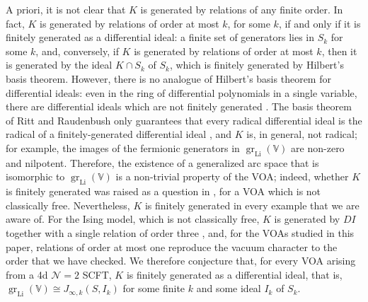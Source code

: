 \documentclass[12pt]{article}
\numberwithin{equation}{section}
\numberwithin{figure}{section}
\theoremstyle{plain}
\theoremstyle{definition}
\begin{document}
A priori, it is not clear that $K$ is generated by relations of any finite order. In fact, $K$ is generated by relations of order at most $k$, for some $k$, if and only if it is finitely generated as a differential ideal: a finite set of generators lies in $S_k$ for some $k$, and, conversely, if $K$ is generated by relations of order at most $k$, then it is generated by the ideal $K \cap S_k$ of $S_k$, which is finitely generated by Hilbert's basis theorem. However, there is no analogue of Hilbert's basis theorem for differential ideals: even in the ring of differential polynomials in a single variable, there are differential ideals which are not finitely generated \cite{Ritt}. The basis theorem of Ritt and Raudenbush only guarantees that every radical differential ideal is the radical of a finitely-generated differential ideal \cite{Ritt,Kolchin}, and $K$ is, in general, not radical; for example, the images of the fermionic generators in $\operatorname{gr}_{\operatorname{Li}}(\mathbb{V})$ are non-zero and nilpotent. Therefore, the existence of a generalized arc space that is isomorphic to $\operatorname{gr}_{\operatorname{Li}}(\mathbb{V})$ is a non-trivial property of the VOA; indeed, whether $K$ is finitely generated was raised as a question in \cite{ArakawaLinshaw:2019}, for a VOA which is not classically free. Nevertheless, $K$ is finitely generated in every example that we are aware of. For the Ising model, which is not classically free, $K$ is generated by $DI$ together with a single relation of order three \cite{MR4589087}, and, for the VOAs studied in this paper, relations of order at most one reproduce the vacuum character to the order that we have checked. We therefore conjecture that, for every VOA arising from a 4d $\mathcal{N}=2$ SCFT, $K$ is finitely generated as a differential ideal, that is, $\operatorname{gr}_{\operatorname{Li}}(\mathbb{V}) \cong J_{\infty,k}(S, I_k)$ for some finite $k$ and some ideal $I_k$ of $S_k$.
\end{document}
